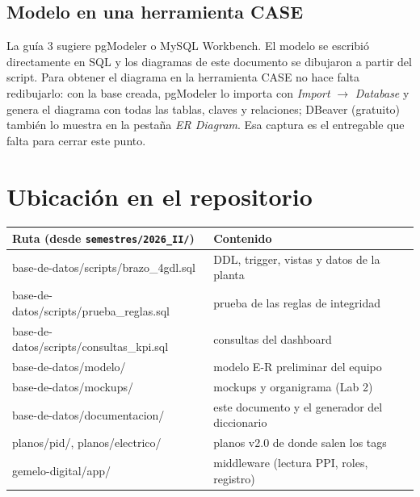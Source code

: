 \documentclass[a4paper,11pt]{article}
\begin{document}
\subsection{Modelo en una herramienta CASE}\label{sec:case}
La guía 3 sugiere pgModeler o MySQL Workbench. El modelo se escribió directamente en SQL y los diagramas de este documento se dibujaron a partir del script. Para obtener el diagrama en la herramienta CASE no hace falta redibujarlo: con la base creada, pgModeler lo importa con \emph{Import} $\to$ \emph{Database} y genera el diagrama con todas las tablas, claves y relaciones; DBeaver (gratuito) también lo muestra en la pestaña \emph{ER Diagram}. Esa captura es el entregable que falta para cerrar este punto.

\section{Ubicación en el repositorio}\label{sec:repo}
\begin{center}\small
\begin{tabularx}{\linewidth}{>{\ttfamily\raggedright}p{7.4cm} >{\raggedright\arraybackslash}X}
\toprule
\textrm{\textbf{Ruta (desde \texttt{semestres/2026\_II/})}} & \textbf{Contenido}\\
\midrule
base-de-datos/scripts/brazo\_4gdl.sql & DDL, trigger, vistas y datos de la planta\\
base-de-datos/scripts/prueba\_reglas.sql & prueba de las reglas de integridad\\
base-de-datos/scripts/consultas\_kpi.sql & consultas del dashboard\\
base-de-datos/modelo/ & modelo E-R preliminar del equipo\\
base-de-datos/mockups/ & mockups y organigrama (Lab 2)\\
base-de-datos/documentacion/ & este documento y el generador del diccionario\\
planos/pid/, planos/electrico/ & planos v2.0 de donde salen los tags\\
gemelo-digital/app/ & middleware (lectura PPI, roles, registro)\\
\bottomrule
\end{tabularx}
\end{center}

\end{document}

